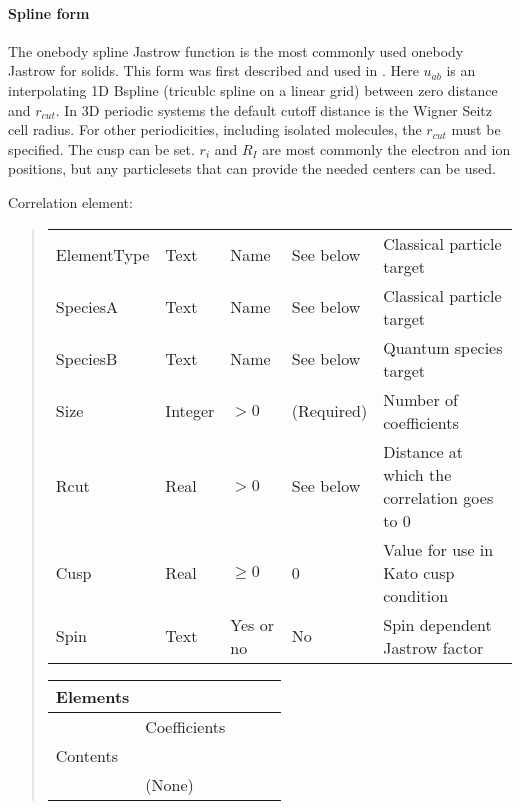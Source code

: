 \documentclass[letterpaper,10pt,english]{sphinxmanual}
\begin{document}
\paragraph{Spline form}
\label{\detokenize{intro_wavefunction:spline-form}}\label{\detokenize{intro_wavefunction:onebodyjastrowspline}}
The one\sphinxhyphen{}body spline Jastrow function is the most commonly used one\sphinxhyphen{}body
Jastrow for solids. This form was first described and used in
. Here
\(u_{ab}\) is an interpolating 1D B\sphinxhyphen{}spline (tricublc spline on a
linear grid) between zero distance and \(r_{cut}\). In 3D periodic
systems the default cutoff distance is the Wigner Seitz cell radius. For
other periodicities, including isolated molecules, the \(r_{cut}\)
must be specified. The cusp can be set. \(r_i\) and \(R_I\) are
most commonly the electron and ion positions, but any particlesets that
can provide the needed centers can be used.

Correlation element:
\begin{quote}


\begin{savenotes}\sphinxattablestart
\centering
\begin{tabulary}{\linewidth}[t]{|T|T|T|T|T|}
\hline

&
&
&
&
\\
\hline
ElementType
&
Text
&
Name
&
See below
&
Classical
particle
target
\\
\hline
SpeciesA
&
Text
&
Name
&
See below
&
Classical
particle
target
\\
\hline
SpeciesB
&
Text
&
Name
&
See below
&
Quantum
species
target
\\
\hline
Size
&
Integer
&
\(> 0\)
&
(Required)
&
Number of
coefficients
\\
\hline
Rcut
&
Real
&
\(> 0\)
&
See below
&
Distance at
which the
correlation
goes to 0
\\
\hline
Cusp
&
Real
&
\(\ge 0\)
&
0
&
Value for
use in Kato
cusp
condition
\\
\hline
Spin
&
Text
&
Yes or no
&
No
&
Spin
dependent
Jastrow
factor
\\
\hline
\end{tabulary}
\par
\sphinxattableend\end{savenotes}


\begin{savenotes}\sphinxattablestart
\centering
\begin{tabulary}{\linewidth}[t]{|T|T|T|T|T|}
\hline

Elements
&&&&\\
\hline&
Coefficients
&&&\\
\hline
Contents
&&&&\\
\hline&
(None)
&&&\\
\hline
\end{tabulary}
\par
\sphinxattableend\end{savenotes}
\end{quote}
\end{document}
